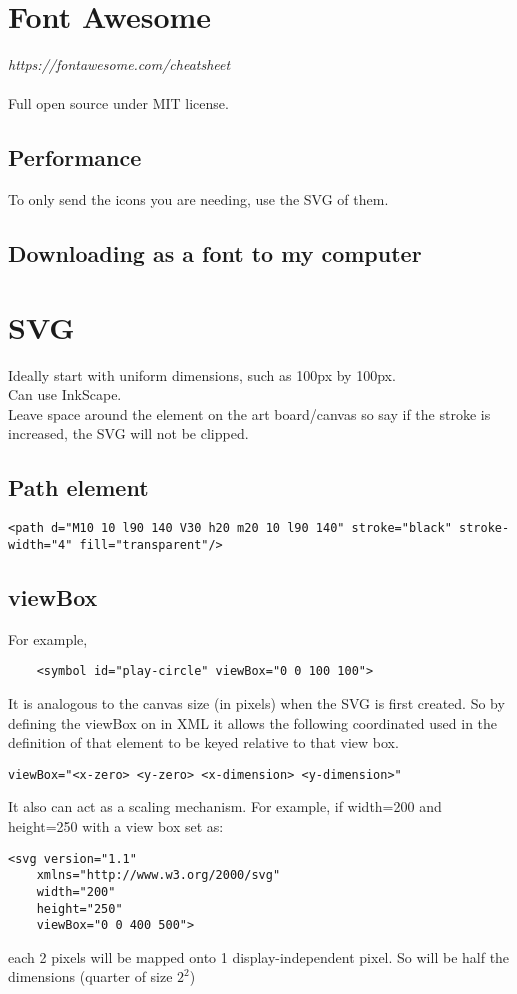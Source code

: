 \documentclass[]{article}
\newcommand{\<}{\guilsinglleft}
\renewcommand{\>}{\guilsinglright}
\renewcommand{\it}[1]{\textit{#1}}
\begin{document}
\section{Font Awesome}
\it{https://fontawesome.com/cheatsheet}\\\\
Full open source under MIT license.

\subsection{Performance}
To only send the icons you are needing, use the SVG of them.

\subsection{Downloading as a font to my computer}



\section{SVG}
Ideally start with uniform dimensions, such as 100px by 100px.
\\
Can use InkScape.
\\
Leave space around the element on the art board/canvas so say if the stroke is increased, the SVG will not be clipped.

\subsection{Path element}
\begin{lstlisting}
<path d="M10 10 l90 140 V30 h20 m20 10 l90 140" stroke="black" stroke-width="4" fill="transparent"/>
\end{lstlisting}

\subsection{viewBox}
For example,
\begin{lstlisting}
    <symbol id="play-circle" viewBox="0 0 100 100">
\end{lstlisting}
It is analogous to the canvas size (in pixels) when the SVG is first created.  So by defining the viewBox on in XML it allows the following coordinated used in the definition of that element to be keyed relative to that view box.
\begin{lstlisting}
viewBox="<x-zero> <y-zero> <x-dimension> <y-dimension>"
\end{lstlisting}
It also can act as a scaling mechanism.  For example, if width=200 and height=250 with a view box set as:
\begin{lstlisting}
<svg version="1.1"
	xmlns="http://www.w3.org/2000/svg"
	width="200"
	height="250"
	viewBox="0 0 400 500">
\end{lstlisting}
each 2 pixels will be mapped onto 1 display-independent pixel.  So will be half the dimensions (quarter of size $2^2$)
\end{document}
